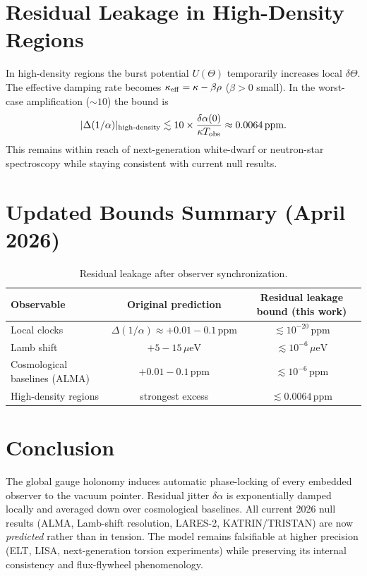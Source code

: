 \documentclass[11pt]{article}
\begin{document}
\section{Residual Leakage in High-Density Regions}

In high-density regions the burst potential \(U(\Theta)\) temporarily increases local \(\delta\Theta\). The effective damping rate becomes \(\kappa_{\rm eff}=\kappa-\beta\rho\) (\(\beta>0\) small). In the worst-case amplification (\(\sim10\)) the bound is
\[
|\Delta(1/\alpha)|_{\rm high\text{-}density}\lesssim10\times\frac{\delta\alpha(0)}{\kappa T_{\rm obs}}\approx0.0064\,\text{ppm}.
\]
This remains within reach of next-generation white-dwarf or neutron-star spectroscopy while staying consistent with current null results.

\section{Updated Bounds Summary (April 2026)}

\begin{table}[h]
\centering
\begin{tabular}{lcc}
\toprule
Observable & Original prediction & Residual leakage bound (this work) \\
\midrule
Local clocks & \(\Delta(1/\alpha)\approx+0.01{-}0.1\,\text{ppm}\) & \(\lesssim10^{-20}\,\text{ppm}\) \\
Lamb shift & \(+5{-}15\,\mu\text{eV}\) & \(\lesssim10^{-6}\,\mu\text{eV}\) \\
Cosmological baselines (ALMA) & \(+0.01{-}0.1\,\text{ppm}\) & \(\lesssim10^{-6}\,\text{ppm}\) \\
High-density regions & strongest excess & \(\lesssim0.0064\,\text{ppm}\) \\
\bottomrule
\end{tabular}
\caption{Residual leakage after observer synchronization.}
\end{table}

\section{Conclusion}

The global gauge holonomy induces automatic phase-locking of every embedded observer to the vacuum pointer. Residual jitter \(\delta\alpha\) is exponentially damped locally and averaged down over cosmological baselines. All current 2026 null results (ALMA, Lamb-shift resolution, LARES-2, KATRIN/TRISTAN) are now \emph{predicted} rather than in tension. The model remains falsifiable at higher precision (ELT, LISA, next-generation torsion experiments) while preserving its internal consistency and flux-flywheel phenomenology.
\end{document}
